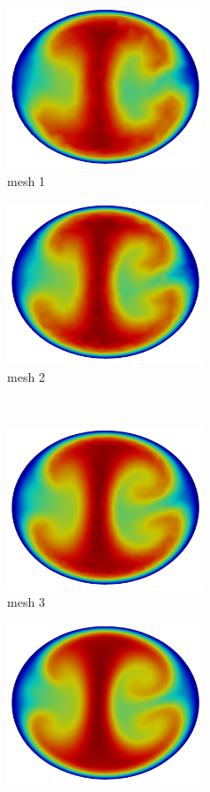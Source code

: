 \begin{figure}[htbp]
    \centering
    \begin{minipage}[c][2in][c]{0.4\linewidth}
        \centering
        \includegraphics[width=2.3in]{imgs/vena_cava/Umag_mesh1.png}\\
        mesh 1
    \end{minipage}
    \begin{minipage}[c][2in][c]{0.4\linewidth}
        \centering
        \includegraphics[width=2.3in]{imgs/vena_cava/Umag_mesh2.png}\\
        mesh 2
    \end{minipage}\\[.5\baselineskip]
    \begin{minipage}[c][2in][c]{0.4\linewidth}
        \centering
        \includegraphics[width=2.3in]{imgs/vena_cava/Umag_mesh3.png}\\
        mesh 3
    \end{minipage}
    \begin{minipage}[c][2in][c]{0.4\linewidth}
        \centering
        \includegraphics[width=2.3in]{imgs/vena_cava/Umag_mesh4.png}\\

\end{minipage}
\end{figure}
